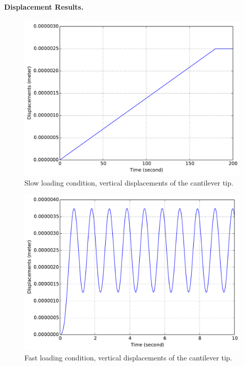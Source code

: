 \documentclass[fleqn,11pt]{article}
\begin{document}
\paragraph{Displacement Results.}

\begin{figure}[!htb]
  \centering
  \includegraphics[width=12cm]{../Figure-files/_Chapter_Appendix_Illustrative_Examples/brick-5element-slowLoading.pdf}
  \caption{Slow loading condition, vertical displacements of the cantilever tip.}
  \label{fig_brick5-slow}
\end{figure}


\begin{figure}[!htb]
  \centering
  \includegraphics[width=12cm]{../Figure-files/_Chapter_Appendix_Illustrative_Examples/brick-5element-fastLoading.pdf}
  \caption{Fast loading condition, vertical displacements of the cantilever tip.}
  \label{fig_brick5-fast}
\end{figure}
\end{document}
